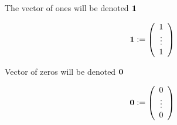 \begin{frame}

    \vspace{2em}
    The vector of ones will be denoted ${\mathbf 1}$ 
    
    \begin{equation*}
        {\mathbf 1} := 
        \left(
        \begin{array}{c}
            1 \\
            \vdots \\
            1
        \end{array}
        \right)
    \end{equation*}

    Vector of zeros will be denoted ${\mathbf 0}$

    \begin{equation*}
        {\mathbf 0} := 
        \left(
        \begin{array}{c}
            0 \\
            \vdots \\
            0
        \end{array}
        \right)
    \end{equation*}

\end{frame}


